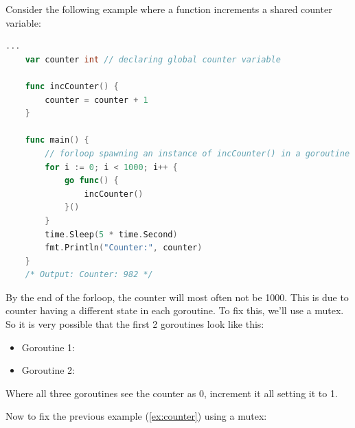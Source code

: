 \vspace{-.5em}
\begin{Example}

    \label{ex:counter}
    Consider the following example where a function  increments a shared counter variable:
    \begin{lstlisting}[language=Go, caption=Incrementing a Counter Variable, label={lst:counter}, numbers=none]
    ...
    var counter int // declaring global counter variable
    
    func incCounter() {
        counter = counter + 1
    }

    func main() {
        // forloop spawning an instance of incCounter() in a goroutine
        for i := 0; i < 1000; i++ {
            go func() {
                incCounter()
            }()
        }
        time.Sleep(5 * time.Second)
        fmt.Println("Counter:", counter)
    }
    /* Output: Counter: 982 */
    \end{lstlisting}
    \noindent
    By the end of the forloop, the counter will most often not be 1000. This is due to counter having 
    a different state in each goroutine. To fix this, we'll use a mutex. So it is very possible that the first 2 goroutines 
    look like this:
    \begin{itemize}
        \item Goroutine 1: 
        \item Goroutine 2: 
    \end{itemize}
    \noindent
    Where all three goroutines see the counter as 0, increment it all setting it to 1.
\end{Example}

\newpage 

\noindent
Now to fix the previous example (\ref{ex:counter}) using a mutex:

